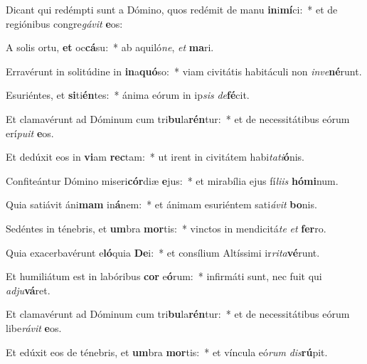 \item Dicant qui redémpti sunt a Dómino, quos redémit de manu \textbf{in}i\textbf{mí}ci:~* et de regiónibus congre\textit{gá}\textit{vit} \textbf{e}os:
\item A solis ortu, \textbf{et} oc\textbf{cá}su:~* ab aquiló\textit{ne}, \textit{et} \textbf{ma}ri.
\item Erravérunt in solitúdine in \textbf{in}a\textbf{quó}so:~* viam civitátis habitáculi non \textit{in}\textit{ve}\textbf{né}runt.
\item Esuriéntes, et \textbf{si}ti\textbf{én}tes:~* ánima eórum in ip\textit{sis} \textit{de}\textbf{fé}cit.
\item Et clamavérunt ad Dóminum cum tri\textbf{bu}la\textbf{rén}tur:~* et de necessitátibus eórum erí\textit{pu}\textit{it} \textbf{e}os.
\item Et dedúxit eos in \textbf{vi}am \textbf{rec}tam:~* ut irent in civitátem habi\textit{ta}\textit{ti}\textbf{ó}nis.
\item Confiteántur Dómino miseri\textbf{cór}diæ \textbf{e}jus:~* et mirabília ejus fí\textit{li}\textit{is} \textbf{hó}\textbf{mi}num.
\item Quia satiávit áni\textbf{mam} in\textbf{á}nem:~* et ánimam esuriéntem sati\textit{á}\textit{vit} \textbf{bo}nis.
\item Sedéntes in ténebris, et \textbf{um}bra \textbf{mor}tis:~* vinctos in mendicitá\textit{te} \textit{et} \textbf{fer}ro.
\item Quia exacerbavérunt e\textbf{ló}quia \textbf{De}i:~* et consílium Altíssimi ir\textit{ri}\textit{ta}\textbf{vé}runt.
\item Et humiliátum est in labóribus \textbf{cor} e\textbf{ó}rum:~* infirmáti sunt, nec fuit qui \textit{ad}\textit{ju}\textbf{vá}ret.
\item Et clamavérunt ad Dóminum cum tri\textbf{bu}la\textbf{rén}tur:~* et de necessitátibus eórum libe\textit{rá}\textit{vit} \textbf{e}os.
\item Et edúxit eos de ténebris, et \textbf{um}bra \textbf{mor}tis:~* et víncula eó\textit{rum} \textit{dis}\textbf{rú}pit.
